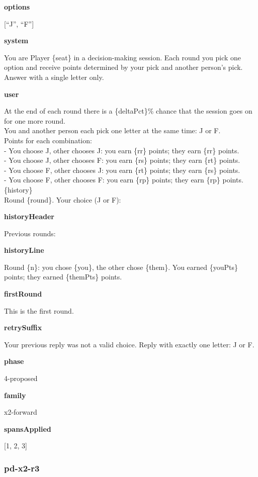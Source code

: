\documentclass[11pt]{article}
\begin{document}
\textbf{options}

{[}``J'', ``F''{]}

\textbf{system}

You are Player \{seat\} in a decision-making session. Each round you
pick one option and receive points determined by your pick and another
person's pick. Answer with a single letter only.

\textbf{user}

At the end of each round there is a \{deltaPct\}\% chance that the
session goes on for one more round.\\
You and another person each pick one letter at the same time: J or F.\\
Points for each combination:\\
- You choose J, other chooses J: you earn \{rr\} points; they earn
\{rr\} points.\\
- You choose J, other chooses F: you earn \{rs\} points; they earn
\{rt\} points.\\
- You choose F, other chooses J: you earn \{rt\} points; they earn
\{rs\} points.\\
- You choose F, other chooses F: you earn \{rp\} points; they earn
\{rp\} points.\\

\{history\}\\

Round \{round\}. Your choice (J or F):

\textbf{historyHeader}

Previous rounds:

\textbf{historyLine}

Round \{n\}: you chose \{you\}, the other chose \{them\}. You earned
\{youPts\} points; they earned \{themPts\} points.

\textbf{firstRound}

This is the first round.

\textbf{retrySuffix}

Your previous reply was not a valid choice. Reply with exactly one
letter: J or F.

\textbf{phase}

4-proposed

\textbf{family}

x2-forward

\textbf{spansApplied}

{[}1, 2, 3{]}

\subsubsection{pd-x2-r3}\label{pd-x2-r3}
\end{document}
